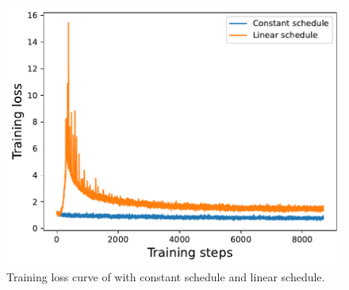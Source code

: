\begin{figure}[ht]
\centering
\includegraphics[width=1.0\linewidth]{assets/loss_ewa.pdf}
\caption{Training loss curve of \ewa with constant schedule and linear schedule.}
\label{fig:loss_ewa}
\end{figure}
